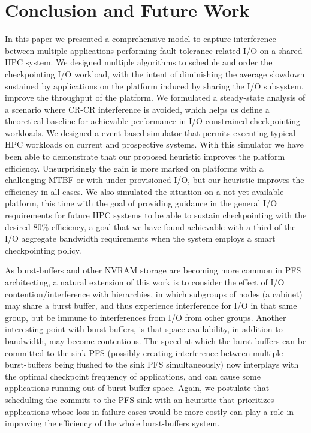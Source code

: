 \section{Conclusion and Future Work}
\label{sec:conclusion}

In this paper we presented a comprehensive model to capture interference
between multiple applications performing fault-tolerance related I/O
on a shared HPC system. We designed multiple algorithms
to schedule and order the checkpointing I/O workload, with the intent of
diminishing the average slowdown sustained by applications on the
platform induced by sharing the I/O subsystem, \ie improve the throughput
of the platform. We formulated a steady-state analysis of a scenario
where CR-CR interference is avoided, which helps us
define a theoretical baseline for achievable performance in I/O
constrained checkpointing workloads.
We designed a event-based simulator that permits
executing typical HPC workloads on current and prospective systems.
With this simulator we have been able to demonstrate that our proposed
heuristic improves the platform efficiency. Unsurprisingly the gain is
more marked on platforms with a challenging MTBF or with
under-provisioned I/O, but our heuristic improves the efficiency in
all cases.  We also simulated the situation on a not yet available
platform, this time with the goal of providing guidance in the
general I/O requirements for future HPC systems to be able to
sustain checkpointing with the desired 80\% efficiency, a goal that
we have found achievable with a third of the I/O aggregate bandwidth
requirements when the system employs a smart checkpointing policy.

As burst-buffers and other NVRAM storage are becoming more common
in PFS architecting, a natural extension of this work is to consider the effect
 of I/O contention/interference with hierarchies, in which subgroups of
 nodes (\eg a cabinet) may share a burst buffer, and thus experience
interference for I/O in that same group, but be immune to interferences
from I/O from other groups. Another interesting point with burst-buffers,
is that space availability, in addition to bandwidth, may become
contentious. The speed at which the burst-buffers can be committed to
the sink PFS (possibly creating interference between multiple burst-buffers being
flushed to the sink PFS simultaneously) now interplays with the
optimal checkpoint frequency of applications, and can cause some
applications running out of burst-buffer space. Again, we postulate that
scheduling the commits to the PFS sink with an heuristic that prioritizes
applications whose loss in failure cases would be more costly
can play a role in improving the efficiency of the whole burst-buffers
system.
